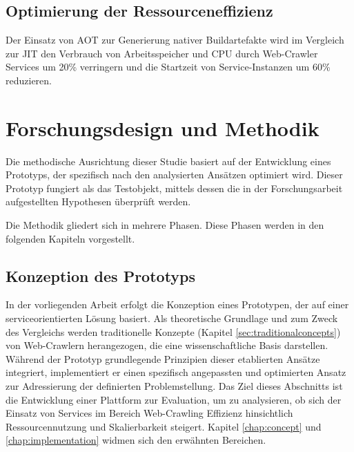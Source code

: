 \subsection{Optimierung der Ressourceneffizienz} \label{subsec:hypothesis:ressource}
Der Einsatz von \acl{AOT} zur Generierung nativer Buildartefakte wird im Vergleich zur \acl{JIT} den Verbrauch von Arbeitsspeicher und CPU durch Web-Crawler Services um 20\% verringern und die Startzeit von Service-Instanzen um 60\% reduzieren.




\section{Forschungsdesign und Methodik}\label{sec:method} %
Die methodische Ausrichtung dieser Studie basiert auf der Entwicklung eines Prototyps, der spezifisch nach den analysierten Ansätzen optimiert wird. Dieser Prototyp fungiert als das Testobjekt, mittels dessen die in der Forschungsarbeit aufgestellten Hypothesen überprüft werden.

Die Methodik gliedert sich in mehrere Phasen. Diese Phasen werden in den folgenden Kapiteln vorgestellt.

\subsection{Konzeption des Prototyps} \label{subsec:prototype}
In der vorliegenden Arbeit erfolgt die Konzeption eines Prototypen, der auf einer serviceorientierten Lösung basiert. Als theoretische Grundlage und zum Zweck des Vergleichs werden traditionelle Konzepte (Kapitel \ref{sec:traditionalconcepts}) von Web-Crawlern herangezogen, die eine wissenschaftliche Basis darstellen. Während der Prototyp grundlegende Prinzipien dieser etablierten Ansätze integriert, implementiert er einen spezifisch angepassten und optimierten Ansatz zur Adressierung der definierten Problemstellung. Das Ziel dieses Abschnitts ist die Entwicklung einer Plattform zur Evaluation, um zu analysieren, ob sich der Einsatz von Services im Bereich Web-Crawling Effizienz hinsichtlich Ressourcennutzung und Skalierbarkeit steigert. Kapitel \ref{chap:concept} und \ref{chap:implementation} widmen sich den erwähnten Bereichen.

